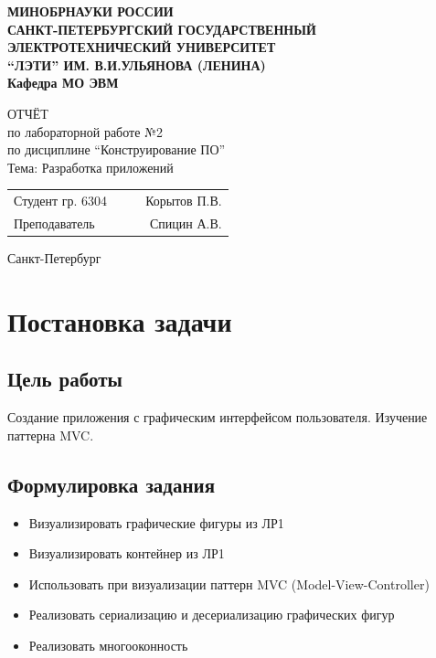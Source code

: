 \documentclass[a4paper, 14pt]{extarticle}
\begin{document}
\begin{titlepage}
    \centering
    {\bfseries
        \uppercase{
            Минобрнауки России \\
            Санкт-Петербургский государственный \\
            Электротехнический университет \\
            \enquote{ЛЭТИ} им. В.И.Ульянова (Ленина)\\
        }
        Кафедра МО ЭВМ

        \vspace{\fill}
        \uppercase{Отчёт} \\
        по лабораторной работе №2 \\
        по дисциплине \enquote{Конструирование ПО} \\
        Тема: Разработка приложений
    }

    \vspace{\fill}
    \begin{tabularx}{0.8\textwidth}{l X c r}
        Студент гр. 6304 & & \underline{\hspace{3cm}} & Корытов П.В.\\
        Преподаватель & & \underline{\hspace{3cm}} & Спицин А.В.
    \end{tabularx}

    \vspace{1cm}
    Санкт-Петербург \\
    \the\year{}
\end{titlepage}

\tableofcontents{}
\newpage

\section{Постановка задачи}
\subsection{Цель работы}
Создание приложения с графическим интерфейсом пользователя. Изучение паттерна MVC.\@

\subsection{Формулировка задания}
\begin{itemize}
    \item Визуализировать графические фигуры из ЛР1
    \item Визуализировать контейнер из ЛР1
    \item Использовать при визуализации паттерн MVC (Model-View-Controller)
    \item Реализовать сериализацию и десериализацию графических фигур
    \item Реализовать многооконность
\end{itemize}
\end{document}
